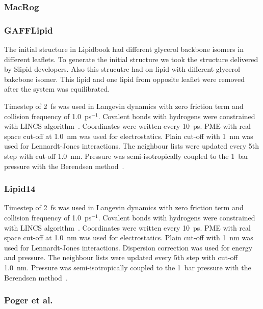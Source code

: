 \documentclass[pre,aps,floatfix,authordate1-4,twocolumn]{revtex4-1}
\begin{document}

\subsubsection{MacRog}
\subsubsection{GAFFLipid}
The initial structure in Lipidbook had different glycerol backbone isomers in different leaflets. 
To generate the initial structure we took the structure delivered by Slipid developers. Also this strucutre
had on lipid with different glycerol bakcbone isomer. This lipid and one lipid from opposite leaflet were removed
after the system was equilibrated.

Timestep of 2~fs was used in Langevin dynamics with zero friction term and collision frequency of 1.0~ps$^{-1}$. 
Covalent bonds with hydrogens were constrained with LINCS algorithm~\cite{hess97,hess07}.
Coordinates were written every 10~ps. PME with real space cut-off at 1.0~nm was used 
for electrostatics. Plain cut-off with 1~nm was used for Lennardt-Jones interactions. 
The neighbour lists were updated every 5th step with cut-off 1.0~nm. 
Pressure was semi-isotropically coupled to the 1~bar pressure with the Berendsen method~\cite{berendsen84}.
\subsubsection{Lipid14}

Timestep of 2~fs was used in Langevin dynamics with zero friction term and collision frequency of 1.0~ps$^{-1}$. 
Covalent bonds with hydrogens were constrained with LINCS algorithm~\cite{hess97,hess07}.
Coordinates were written every 10~ps. PME with real space cut-off at 1.0~nm was used 
for electrostatics. Plain cut-off with 1~nm was used for Lennardt-Jones interactions. Dispersion correction
was used for energy and pressure. The neighbour lists were updated every 5th step with cut-off 1.0~nm. 
Pressure was semi-isotropically coupled to the 1~bar pressure with the Berendsen method~\cite{berendsen84}.

\subsubsection{Poger et al.}
\end{document}
